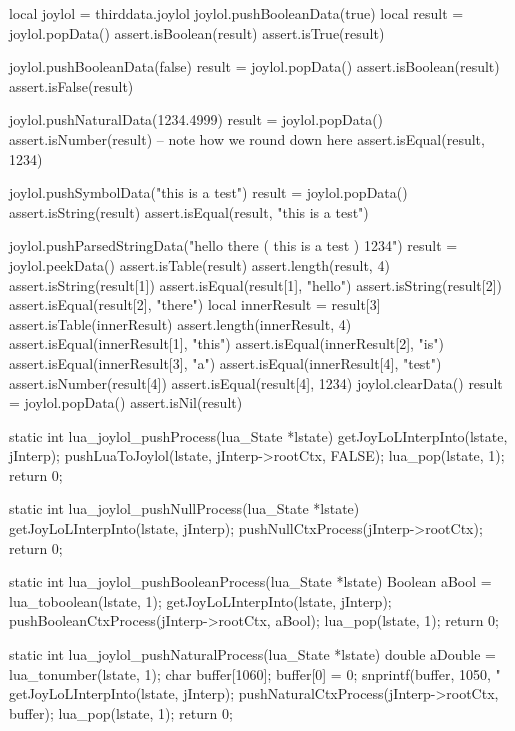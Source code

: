 \startLuaTest
  local joylol = thirddata.joylol
  joylol.pushBooleanData(true)
  local result = joylol.popData()
  assert.isBoolean(result)
  assert.isTrue(result)
  
  joylol.pushBooleanData(false)
  result = joylol.popData()
  assert.isBoolean(result)
  assert.isFalse(result)
  
  joylol.pushNaturalData(1234.4999)
  result = joylol.popData()
  assert.isNumber(result)
  -- note how we round down here
  assert.isEqual(result, 1234)
  
  joylol.pushSymbolData("this is a test")
  result = joylol.popData()
  assert.isString(result)
  assert.isEqual(result, "this is a test")
  
  joylol.pushParsedStringData("hello there ( this is a test ) 1234")
  result = joylol.peekData()
  assert.isTable(result)
  assert.length(result, 4)
  assert.isString(result[1])
  assert.isEqual(result[1], "hello")
  assert.isString(result[2])
  assert.isEqual(result[2], "there")
  local innerResult = result[3]
  assert.isTable(innerResult)
  assert.length(innerResult, 4)
  assert.isEqual(innerResult[1], "this")
  assert.isEqual(innerResult[2], "is")
  assert.isEqual(innerResult[3], "a")
  assert.isEqual(innerResult[4], "test")
  assert.isNumber(result[4])
  assert.isEqual(result[4], 1234)
  joylol.clearData()
  result = joylol.popData()
  assert.isNil(result)
\stopLuaTest
\stopTestCase
\stopTestSuite

\startCCode
static int lua_joylol_pushProcess(lua_State *lstate) {
  getJoyLoLInterpInto(lstate, jInterp);
  pushLuaToJoylol(lstate, jInterp->rootCtx, FALSE);
  lua_pop(lstate, 1);
  return 0;
}

static int lua_joylol_pushNullProcess(lua_State *lstate) {
  getJoyLoLInterpInto(lstate, jInterp);
  pushNullCtxProcess(jInterp->rootCtx);
  return 0;
}

static int lua_joylol_pushBooleanProcess(lua_State *lstate) {
  Boolean aBool = lua_toboolean(lstate, 1);
  getJoyLoLInterpInto(lstate, jInterp);
  pushBooleanCtxProcess(jInterp->rootCtx, aBool);
  lua_pop(lstate, 1);
  return 0;
}

static int lua_joylol_pushNaturalProcess(lua_State *lstate) {
  double aDouble = lua_tonumber(lstate, 1);
  char buffer[1060];
  buffer[0] = 0;
  snprintf(buffer, 1050, "%
  getJoyLoLInterpInto(lstate, jInterp);
  pushNaturalCtxProcess(jInterp->rootCtx, buffer);
  lua_pop(lstate, 1);
  return 0;
}

